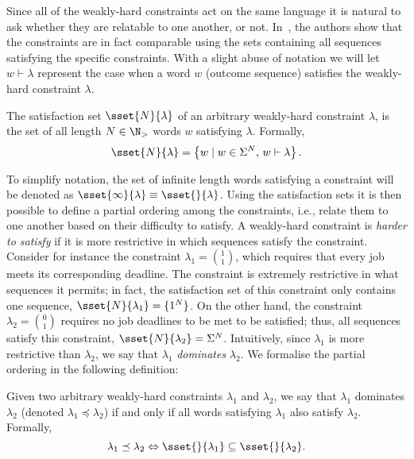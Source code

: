 Since all of the weakly-hard constraints act on the same language it is natural to ask whether they are relatable to one another, or not.
In~\cite{Bernat:2001}, the authors show that the constraints are in fact comparable using the sets containing all sequences satisfying the specific constraints.
With a slight abuse of notation we will let $w \vdash \lambda$ represent the case when a word $w$ (outcome sequence) satisfies the weakly-hard constraint $\lambda$.
%
\begin{definition}
    The satisfaction set $\sset{N}{\lambda}$ of an arbitrary weakly-hard constraint $\lambda$, is the set of all length $N \in \N_{>}$ words $w$ satisfying $\lambda$.
    Formally,
    \begin{equation*}
        \sset{N}{\lambda} = \left\{ w \mid w \in \Sigma^N,\, w \vdash \lambda \right\}.
    \end{equation*}
\end{definition}
%
To simplify notation, the set of infinite length words satisfying a constraint will be denoted as $\sset{\infty}{\lambda} \equiv \sset{}{\lambda}$.
Using the satisfaction sets it is then possible to define a partial ordering among the constraints, i.e., relate them to one another based on their difficulty to satisfy.
A weakly-hard constraint is \emph{harder to satisfy} if it is more restrictive in which sequences satisfy the constraint.
Consider for instance the constraint $\lambda_1 = \binom{1}{1}$, which requires that every job meets its corresponding deadline.
The constraint is extremely restrictive in what sequences it permits; in fact, the satisfaction set of this constraint only contains one sequence, $\sset{N}{\lambda_1} = \{ 1^N \}$.
On the other hand, the constraint $\lambda_2 = \binom{0}{1}$ requires no job deadlines to be met to be satisfied; thus, all sequences satisfy this constraint, $\sset{N}{\lambda_2} = \Sigma^N$.
Intuitively, since $\lambda_1$ is more restrictive than $\lambda_2$, we say that $\lambda_1$ \emph{dominates} $\lambda_2$.
We formalise the partial ordering in the following definition:
%
\begin{definition}%
    \label{def:kappa:dominance}%
    Given two arbitrary weakly-hard constraints $\lambda_1$ and $\lambda_2$, we say that $\lambda_1$ dominates $\lambda_2$ (denoted $\lambda_1 \preceq \lambda_2$) if and only if all words satisfying $\lambda_1$ also satisfy $\lambda_2$.
    Formally,
    \begin{equation*}
        \lambda_1 \preceq \lambda_2 \Leftrightarrow \sset{}{\lambda_1} \subseteq \sset{}{\lambda_2}.
    \end{equation*}
\end{definition}
